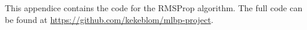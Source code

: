 
This appendice contains the code for the RMSProp algorithm. The full code can be found at \url{https://github.com/kekeblom/mlbp-project}.




